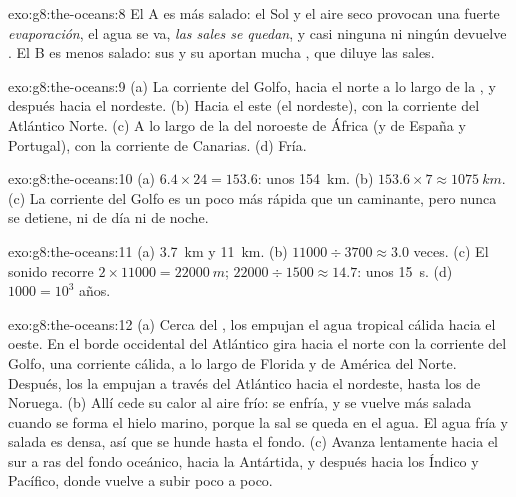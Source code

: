 \begin{solution}{exo:g8:the-oceans:8}
El  A es más salado: el Sol y el aire seco provocan una fuerte
\emph{evaporación}, el agua se va, \emph{las sales se quedan}, y casi
ninguna  ni ningún  devuelve \emph{}. El  B es menos
salado: sus  y su  aportan mucha \emph{}, que diluye
las sales.
\end{solution}

\begin{solution}{exo:g8:the-oceans:9}
(a) La corriente del Golfo, hacia el norte a lo largo de la , y
después hacia el nordeste. (b) Hacia el este (el nordeste), con la
corriente del Atlántico Norte. (c) A lo largo de la  del noroeste de
África (y de España y Portugal), con la corriente de Canarias. (d) Fría.
\end{solution}

\begin{solution}{exo:g8:the-oceans:10}
(a) $6.4 \times 24 = 153.6$: unos \qty{154}{km}. (b) $153.6 \times 7
\approx \qty{1075}{km}$. (c) La corriente del Golfo es un poco más rápida
que un caminante, pero nunca se detiene, ni de día ni de noche.
\end{solution}

\begin{solution}{exo:g8:the-oceans:11}
(a) \qty{3.7}{km} y \qty{11}{km}. (b) $11000 \div 3700 \approx 3.0$
veces. (c) El sonido recorre $2 \times 11000 = \qty{22000}{m}$; $22000
\div 1500 \approx 14.7$: unos \qty{15}{s}. (d) $1000 = 10^3$ años.
\end{solution}

\begin{solution}{exo:g8:the-oceans:12}
(a) Cerca del , los  empujan el agua tropical cálida hacia el
oeste. En el borde occidental del Atlántico gira hacia el norte con la
corriente del Golfo, una corriente cálida, a lo largo de Florida y de
América del Norte. Después, los  la empujan a través del
Atlántico hacia el nordeste, hasta los  de Noruega. (b) Allí cede su
calor al aire frío: se enfría, y se vuelve más salada cuando se forma el
hielo marino, porque la sal se queda en el agua. El agua fría y salada es
densa, así que se hunde hasta el fondo. (c) Avanza lentamente hacia el sur
a ras del fondo oceánico, hacia la Antártida, y después hacia los 
Índico y Pacífico, donde vuelve a subir poco a poco.
\end{solution}

